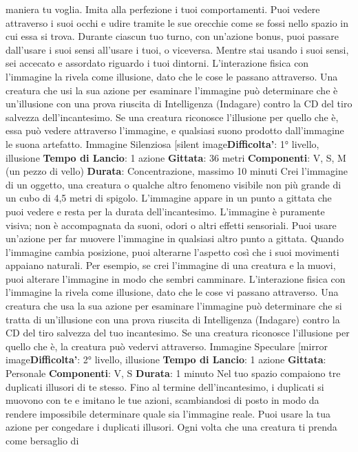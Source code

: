 \begin{multicols}{2}
maniera tu voglia. Imita alla perfezione i tuoi
comportamenti.
Puoi vedere attraverso i suoi occhi e udire tramite le
sue orecchie come se fossi nello spazio in cui essa si
trova. Durante ciascun tuo turno, con un’azione bonus,
puoi passare dall’usare i suoi sensi all’usare i tuoi, o
viceversa. Mentre stai usando i suoi sensi, sei accecato
e assordato riguardo i tuoi dintorni.
L’interazione fisica con l’immagine la rivela come
illusione, dato che le cose le passano attraverso. Una
creatura che usi la sua azione per esaminare
l’immagine può determinare che è un’illusione con una
prova riuscita di Intelligenza (Indagare) contro la CD del
tiro salvezza dell’incantesimo. Se una creatura
riconosce l’illusione per quello che è, essa può vedere
attraverso l’immagine, e qualsiasi suono prodotto
dall’immagine le suona artefatto.
Immagine Silenziosa
[silent image\textbf{Difficolta'}:
1° livello, illusione
\textbf{Tempo di Lancio}: 1 azione
\textbf{Gittata}: 36 metri
\textbf{Componenti}: V, S, M (un pezzo di vello)
\textbf{Durata}: Concentrazione, massimo 10 minuti
Crei l’immagine di un oggetto, una creatura o qualche
altro fenomeno visibile non più grande di un cubo di 4,5
metri di spigolo. L’immagine appare in un punto a
gittata che puoi vedere e resta per la durata
dell’incantesimo. L’immagine è puramente visiva; non è
accompagnata da suoni, odori o altri effetti sensoriali.
Puoi usare un’azione per far muovere l’immagine in
qualsiasi altro punto a gittata. Quando l’immagine
cambia posizione, puoi alterarne l’aspetto così che i
suoi movimenti appaiano naturali. Per esempio, se crei
l’immagine di una creatura e la muovi, puoi alterare
l’immagine in modo che sembri camminare.
L’interazione fisica con l’immagine la rivela come
illusione, dato che le cose vi passano attraverso. Una
creatura che usa la sua azione per esaminare
l’immagine può determinare che si tratta di un’illusione
con una prova riuscita di Intelligenza (Indagare) contro
la CD del tiro salvezza del tuo incantesimo. Se una
creatura riconosce l’illusione per quello che è, la
creatura può vedervi attraverso.
Immagine Speculare
[mirror image\textbf{Difficolta'}:
2° livello, illusione
\textbf{Tempo di Lancio}: 1 azione
\textbf{Gittata}: Personale
\textbf{Componenti}: V, S
\textbf{Durata}: 1 minuto
Nel tuo spazio compaiono tre duplicati illusori di te
stesso. Fino al termine dell’incantesimo, i duplicati si
muovono con te e imitano le tue azioni, scambiandosi di
posto in modo da rendere impossibile determinare
quale sia l’immagine reale. Puoi usare la tua azione per
congedare i duplicati illusori.
Ogni volta che una creatura ti prenda come bersaglio di

\end{multicols}
